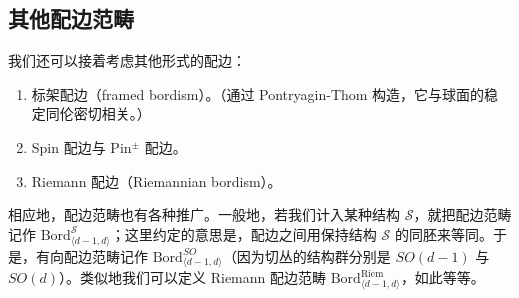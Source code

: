 

\subsection{其他配边范畴} %


我们还可以接着考虑其他形式的配边：
\begin{enumerate}
  \item 标架配边（framed bordism）。（通过 Pontryagin-Thom 构造，它与球面的稳定同伦密切相关。）
  \item Spin 配边与 Pin$^{\pm}$ 配边。
  \item Riemann 配边（Riemannian bordism）。
\end{enumerate}

相应地，配边范畴也有各种推广。一般地，若我们计入某种结构 $\mathcal{S}$，就把配边范畴记作 $\mathrm{Bord}^{\mathcal{S}}_{\langle d-1,d\rangle}$；这里约定的意思是，配边之间用保持结构 $\mathcal{S}$ 的同胚来等同。于是，有向配边范畴记作 $\mathrm{Bord}^{SO}_{\langle d-1,d\rangle}$（因为切丛的结构群分别是 $SO(d-1)$ 与 $SO(d)$）。类似地我们可以定义 Riemann 配边范畴 $\mathrm{Bord}^{\mathrm{Riem}}_{\langle d-1,d\rangle}$，如此等等。

